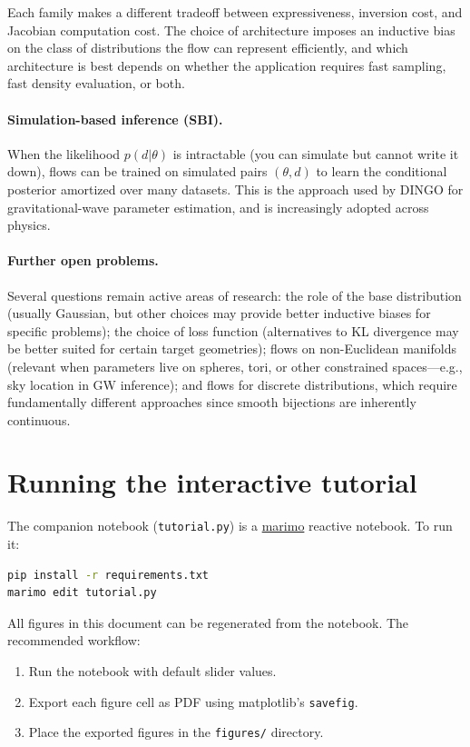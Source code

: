 \documentclass[11pt,letterpaper]{article}
\begin{document}
Each family makes a different tradeoff between expressiveness,
inversion cost, and Jacobian computation cost.
The choice of architecture imposes an inductive bias on the class of
distributions the flow can represent efficiently, and which architecture
is best depends on whether the application requires fast sampling, fast
density evaluation, or both.

\paragraph{Simulation-based inference (SBI).}
When the likelihood $p(d|\theta)$ is intractable (you can simulate but
cannot write it down), flows can be trained on simulated pairs
$(\theta, d)$ to learn the conditional posterior amortized over many
datasets.
This is the approach used by DINGO for gravitational-wave parameter
estimation, and is increasingly adopted across physics.

\paragraph{Further open problems.}
Several questions remain active areas of research:
the role of the base distribution (usually Gaussian, but other choices
may provide better inductive biases for specific problems);
the choice of loss function (alternatives to KL divergence may be
better suited for certain target geometries);
flows on non-Euclidean manifolds (relevant when parameters live on
spheres, tori, or other constrained spaces---e.g., sky location in
GW inference);
and flows for discrete distributions, which require fundamentally
different approaches since smooth bijections are inherently continuous.


\section*{Running the interactive tutorial}

The companion notebook (\texttt{tutorial.py}) is a
\href{https://marimo.io}{marimo} reactive notebook.
To run it:
\begin{lstlisting}[language=bash]
pip install -r requirements.txt
marimo edit tutorial.py
\end{lstlisting}

All figures in this document can be regenerated from the notebook.
The recommended workflow:
\begin{enumerate}
  \item Run the notebook with default slider values.
  \item Export each figure cell as PDF using matplotlib's
        \texttt{savefig}.
  \item Place the exported figures in the \texttt{figures/} directory.
\end{enumerate}
\end{document}

